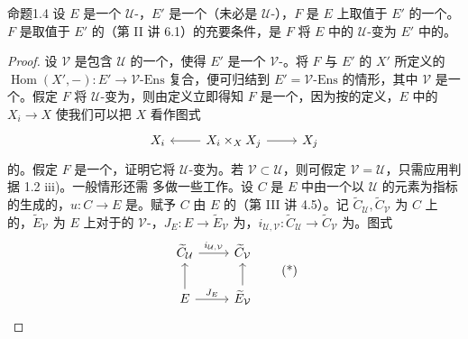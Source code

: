 \begin{SGAresult}{命题}{1.4}
设 $E$ 是一个 $\mathcal U$-，$E'$ 是一个（未必是 $\mathcal U$-），$F$ 是 $E$ 上取值于 $E'$ 的一个。$F$ 是取值于 $E'$ 的（第 II 讲 6.1）的充要条件，是 $F$ 将 $E$ 中的 $\mathcal U$-变为 $E'$ 中的。
\end{SGAresult}
\begin{proof}
设 $\mathcal V$ 是包含 $\mathcal U$ 的一个，使得 $E'$ 是一个 $\mathcal V$-。将 $F$ 与 $E'$ 的 $X'$ 所定义的 $\operatorname{Hom}(X',-):E'\to\mathcal V\text{-}\mathrm{Ens}$ 复合，便可归结到 $E'=\mathcal V\text{-}\mathrm{Ens}$ 的情形，其中 $\mathcal V$ 是一个。假定 $F$ 将 $\mathcal U$-变为，则由定义立即得知 $F$ 是一个，因为按的定义，$E$ 中的 $X_i\to X$ 使我们可以把 $X$ 看作图式
\[
 \begin{tikzcd}X_i & X_i\times_X X_j\arrow[l]\arrow[r] & X_j\end{tikzcd}
\]
的。假定 $F$ 是一个，证明它将 $\mathcal U$-变为。若 $\mathcal V\subset\mathcal U$，则可假定 $\mathcal V=\mathcal U$，只需应用判据 1.2 iii)。一般情形还需
多做一些工作。设 $C$ 是 $E$ 中由一个以 $\mathcal U$ 的元素为指标的生成的，$u:C\to E$ 是。赋予 $C$ 由 $E$ 的（第 III 讲 4.5）。记 $\widetilde C_{\mathcal U},\widetilde C_{\mathcal V}$ 为 $C$ 上的，$\widetilde E_{\mathcal V}$ 为 $E$ 上对于的 $\mathcal V$-，$J_E:E\to\widetilde E_{\mathcal V}$ 为，$i_{\mathcal U,\mathcal V}:\widetilde C_{\mathcal U}\to\widetilde C_{\mathcal V}$ 为。图式
\[
\begin{tikzcd}
\widetilde C_{\mathcal U}\arrow[r,"{i_{\mathcal U,\mathcal V}}"] & \widetilde C_{\mathcal V}\\
E\arrow[u]\arrow[r,"J_E"] & \widetilde E_{\mathcal V}\arrow[u]
\end{tikzcd}\tag{*}
\]
\end{proof}
